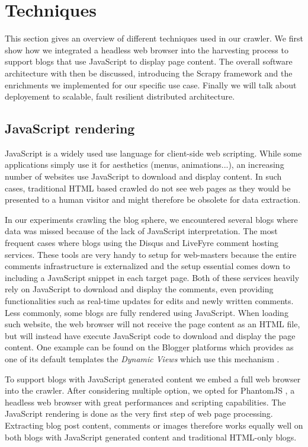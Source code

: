 \section{Techniques}

This section gives an overview of different techniques used in our crawler. We first show how we integrated a headless web browser into the harvesting process to support blogs that use JavaScript to display page content. The overall software architecture with then be discussed, introducing the Scrapy framework and the enrichments we implemented for our specific use case. Finally we will talk about deployement to scalable, fault resilient distributed architecture.


\subsection{JavaScript rendering}
JavaScript is a widely used use language for client-side web scripting. While some applications simply use it for aesthetics (menus, animations...), an increasing number of websites use JavaScript to download and display content. In such cases, traditional HTML based crawled do not see web pages as they would be presented to a human visitor and might therefore be obsolete for data extraction.

In our experiments crawling the blog sphere, we encountered several blogs where data was missed because of the lack of JavaScript interpretation. The most frequent cases where blogs using the Disqus \cite{disqus2013} and LiveFyre \cite{livefyre2013} comment hosting services. These tools are very handy to setup for web-masters because the entire comments infrastructure is externalized and the setup essential comes down to including a JavaScript snippet in each target page. Both of these services heavily rely on JavaScript to download and display the comments, even providing functionalities such as real-time updates for edits and newly written comments. Less commonly, some blogs are fully rendered using JavaScript. When loading such website, the web browser will not receive the page content as an HTML file, but will instead have execute JavaScript code to download and display the page content. One example can be found on the Blogger platforms which provides as one of its default templates the \emph{Dynamic Views} which use this mechanism \cite{antinharasymiv2011}.

To support blogs with JavaScript generated content we embed a full web browser into the crawler. After considering multiple option, we opted for PhantomJS \cite{phantomjs2013}, a headless web browser with great performances and scripting capabilities. The JavaScript rendering is done as the very first step of web page processing. Extracting blog post content, comments or images therefore works equally well on both blogs with JavaScript generated content and traditional HTML-only blogs.

